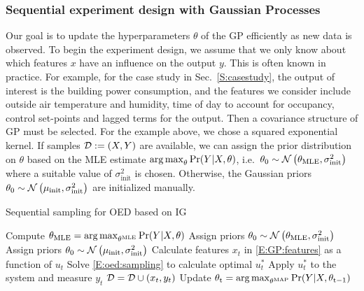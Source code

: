 \subsubsection{Sequential experiment design with Gaussian Processes}

Our goal is to update the hyperparameters \(\theta\) of the GP efficiently as new data is observed. 
To begin the experiment design, we assume that we only know about which features \(x\) have an influence on the output \(y\). This is often known in practice. For example, for the case study in Sec.~\ref{S:casestudy}, the output of interest is the building power consumption, and the features we consider include outside air temperature and humidity, time of day to account for occupancy, control set-points and lagged terms for the output. Then a covariance structure of GP must be selected. For the example above, we chose a squared exponential kernel.
If samples \(\mathcal{D} := (X,Y)\) are available, we can assign the prior distribution on \(\theta\) based on the MLE estimate \( \operatorname*{arg\,max}_\theta \Pr(Y \vert X, \theta)\), i.e.~\(\theta_{\mathrm{0}} \sim \operatorname*{\mathcal{N}}\left(\theta_{\mathrm{MLE}}, \sigma^2_{\mathrm{init}}\right)\) where a suitable value of \(\sigma^2_{\mathrm{init}}\) is chosen.
Otherwise, the Gaussian priors \(\theta_{\mathrm{0}} \sim \operatorname*{\mathcal{N}}\left(\mu_{\mathrm{{init}}}, \sigma^2_\mathrm{init}\right)\) are initialized manually.

\begin{algorithm}[!tb]
	\caption{Sequential sampling for OED based on IG}
	\label{A:oed:sequential}
	\begin{algorithmic}[1]
		\State Compute \( \theta_{\mathrm{MLE}} = \operatorname*{arg\,max}_{\theta^{\mathrm{MLE}}} \Pr(Y \vert X, \theta)\)
		\State Assign priors \(\theta_{\mathrm{0}} \sim \operatorname*{\mathcal{N}}\left(\theta_{\mathrm{MLE}}, \sigma^2_{\mathrm{init}}\right)\)
		\Else 
		\State Assign priors \(\theta_{\mathrm{0}} \sim \operatorname*{\mathcal{N}}\left(\mu_{\mathrm{{init}}}, \sigma^2_\mathrm{init}\right)\)
		\EndIf
		\EndProcedure
		\State Calculate features \(x_t\) in \eqref{E:GP:features} as a function of \(u_t\)
		\State Solve \eqref{E:oed:sampling} to calculate optimal \(u^*_t\)
		\State Apply \(u^*_t\) to the system and measure \(y_t\)
		\State \(\mathcal{D} = \mathcal{D} \cup (x_t,y_t) \)
		\State Update \( \theta_{\mathrm{t}} = \operatorname*{arg\,max}_{\theta^{\mathrm{MAP}}} \Pr(Y \vert X, \theta_{\mathrm{t-1}})\)
		\EndWhile
		\EndProcedure
      \end{algorithmic}
\end{algorithm}

